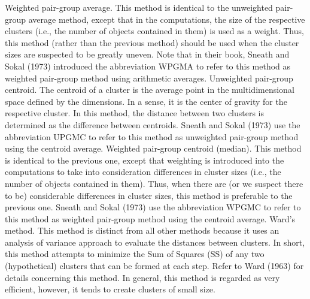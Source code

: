 \documentclass[a4paper,12pt]{report}
\begin{document}
Weighted pair-group average. This method is identical to the unweighted pair-group average method, except that in the computations, the size of the respective clusters (i.e., the number of objects contained in them) is used as a weight. Thus, this method (rather than the previous method) should be used when the cluster sizes are suspected to be greatly uneven. Note that in their book, Sneath and Sokal (1973) introduced the abbreviation WPGMA to refer to this method as weighted pair-group method using arithmetic averages.
Unweighted pair-group centroid. The centroid of a cluster is the average point in the multidimensional space defined by the dimensions. In a sense, it is the center of gravity for the respective cluster. In this method, the distance between two clusters is determined as the difference between centroids. Sneath and Sokal (1973) use the abbreviation UPGMC to refer to this method as unweighted pair-group method using the centroid average.
Weighted pair-group centroid (median). This method is identical to the previous one, except that weighting is introduced into the computations to take into consideration differences in cluster sizes (i.e., the number of objects contained in them). Thus, when there are (or we suspect there to be) considerable differences in cluster sizes, this method is preferable to the previous one. Sneath and Sokal (1973) use the abbreviation WPGMC to refer to this method as weighted pair-group method using the centroid average.
Ward's method. This method is distinct from all other methods because it uses an analysis of variance approach to evaluate the distances between clusters. In short, this method attempts to minimize the Sum of Squares (SS) of any two (hypothetical) clusters that can be formed at each step. Refer to Ward (1963) for details concerning this method. In general, this method is regarded as very efficient, however, it tends to create clusters of small size.
\end{document}

